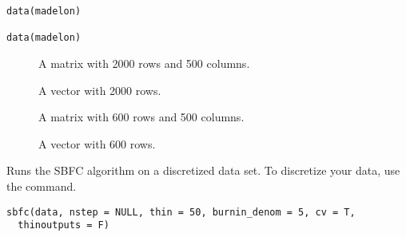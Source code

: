 \documentclass[a4paper]{book}
\begin{document}
%
\begin{Usage}
\begin{verbatim}
data(madelon)

data(madelon)
\end{verbatim}
\end{Usage}
%
\begin{Format}
\begin{description}

\item[] A matrix with 2000 rows and 500 columns.
\item[] A vector with 2000 rows.
\item[] A matrix with 600 rows and 500 columns.
\item[] A vector with 600 rows.

\end{description}
\end{Format}
%
\begin{References}\relax
{}

\end{References}
%
\begin{Description}\relax
Runs the SBFC algorithm on a discretized data set. To discretize your data, use the  command.
\end{Description}
%
\begin{Usage}
\begin{verbatim}
sbfc(data, nstep = NULL, thin = 50, burnin_denom = 5, cv = T,
  thinoutputs = F)
\end{verbatim}
\end{Usage}
%
\end{document}
